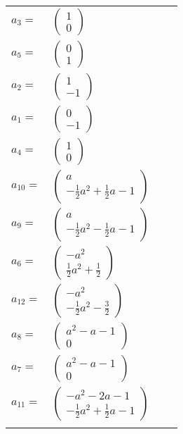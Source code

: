 \documentclass[1p]{elsarticle_modified}
\theoremstyle{definition}
\begin{document}
\begin{tabular}{m{7pt} m{180pt} m{7pt} m{180pt} }
\flushright $a_{3}=$&$\begin{pmatrix}1\\0\end{pmatrix}$ \\
\flushright $a_{5}=$&$\begin{pmatrix}0\\1\end{pmatrix}$ \\
\flushright $a_{2}=$&$\begin{pmatrix}1\\-1\end{pmatrix}$ \\
\flushright $a_{1}=$&$\begin{pmatrix}0\\-1\end{pmatrix}$ \\
\flushright $a_{4}=$&$\begin{pmatrix}1\\0\end{pmatrix}$ \\
\flushright $a_{10}=$&$\begin{pmatrix}a\\-\frac{1}{2} a^2+\frac{1}{2} a-1\end{pmatrix}$ \\
\flushright $a_{9}=$&$\begin{pmatrix}a\\-\frac{1}{2} a^2-\frac{1}{2} a-1\end{pmatrix}$ \\
\flushright $a_{6}=$&$\begin{pmatrix}- a^2\\\frac{1}{2} a^2+\frac{1}{2}\end{pmatrix}$ \\
\flushright $a_{12}=$&$\begin{pmatrix}- a^2\\-\frac{1}{2} a^2-\frac{3}{2}\end{pmatrix}$ \\
\flushright $a_{8}=$&$\begin{pmatrix}a^2- a-1\\0\end{pmatrix}$ \\
\flushright $a_{7}=$&$\begin{pmatrix}a^2- a-1\\0\end{pmatrix}$ \\
\flushright $a_{11}=$&$\begin{pmatrix}- a^2-2 a-1\\-\frac{1}{2} a^2+\frac{1}{2} a-1\end{pmatrix}$\\&\end{tabular}
\end{document}
